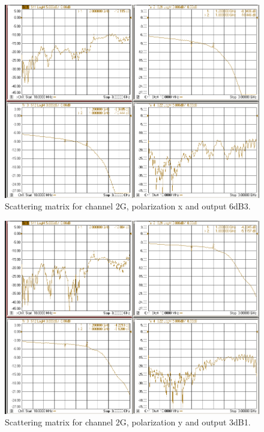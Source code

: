 \documentclass[12pt,a4paper,oneside]{article}
\begin{document}
\begin{figure}[H]
\centering
\includegraphics[width=0.9\linewidth]{VNA_results/2Gx_6dB3.png}
\caption{Scattering matrix for channel 2G, polarization x and output 6dB3.}
\label{fig:2Gx_6dB3}
\end{figure}


\begin{figure}[H]
\centering
\includegraphics[width=0.9\linewidth]{VNA_results/2Gy_3dB1.png}
\caption{Scattering matrix for channel 2G, polarization y and output 3dB1.}
\label{fig:2Gy_3dB1}
\end{figure}
\end{document}
